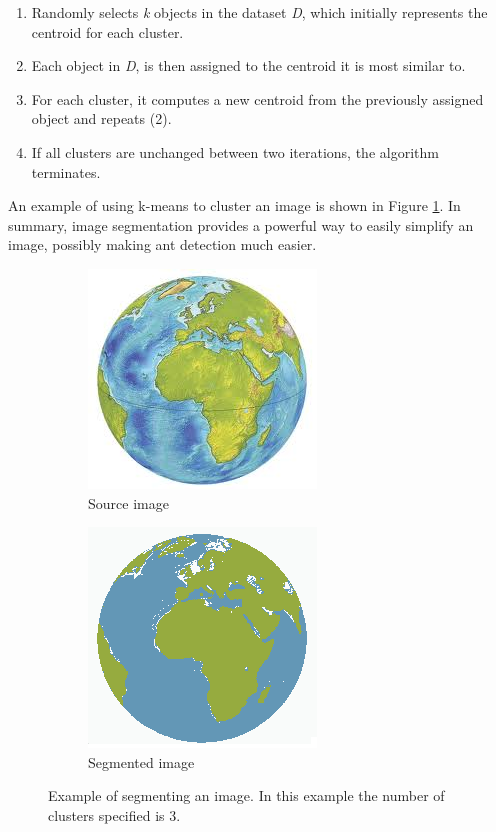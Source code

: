\begin{enumerate}
  \item Randomly selects \textit{k} objects in the dataset \textit{D}, which initially represents the centroid for each cluster.
  \item Each object in \textit{D}, is then assigned to the centroid it is most similar to.
  \item For each cluster, it computes a new centroid from the previously assigned object and repeats (2).
  \item If all clusters are unchanged between two iterations, the algorithm terminates.
\end{enumerate}

An example of using k-means to cluster an image is shown in Figure \ref{fig:segmentation}. In summary, image segmentation provides a powerful way to easily simplify an image, possibly making ant detection much easier. \\

\begin{figure}
        \centering
        \begin{subfigure}[b]{0.3\textwidth}
                \includegraphics[scale = 0.5]{img/earth}
                \caption{Source image}
        \end{subfigure}
		\quad
        \begin{subfigure}[b]{0.3\textwidth}
                \includegraphics[scale = 0.5]{img/earth_segment}
                \caption{Segmented image}
        \end{subfigure}
		\caption{Example of segmenting an image. In this example the number of clusters specified is 3.}
		\label{fig:segmentation}
\end{figure}

